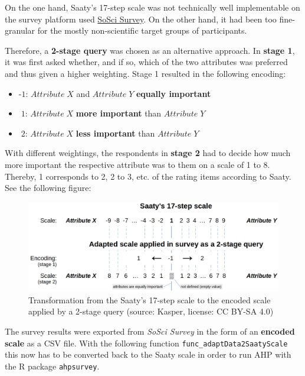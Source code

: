 \documentclass [oneside,10pt,a4paper,ngerman,BCOR10mm,headsepline,parindent,final]{scrartcl}
\providecommand{\tightlist}{%
      \setlength{\itemsep}{0pt}\setlength{\parskip}{0pt}}
\begin{document}
On the one hand, Saaty's 17-step scale was not technically well
implementable on the survey platform used
\href{https://www.soscisurvey.de/}{SoSci Survey}. On the other hand, it
had been too fine-granular for the mostly non-scientific target groups
of participants.

Therefore, a \textbf{2-stage query} was chosen as an alternative
approach. In \textbf{stage 1}, it was first asked whether, and if so,
which of the two attributes was preferred and thus given a higher
weighting. Stage 1 resulted in the following encoding:

\begin{itemize}
\tightlist
\item
  \(\text{-}1\): \(Attribute\;X\) and \(Attribute\;Y\) \textbf{equally
  important}
\item
  \(\;1\): \(Attribute\;X\) \textbf{more important} than
  \(Attribute\;Y\)
\item
  \(\;2\): \(Attribute\;X\) \textbf{less important} than
  \(Attribute\;Y\)
\end{itemize}

    With different weightings, the respondents in \textbf{stage 2} had to
decide how much more important the respective attribute was to them on a
scale of 1 to 8. Thereby, 1 corresponds to 2, 2 to 3, etc. of the rating
items according to Saaty. See the following figure:

\begin{figure}
\centering
\includegraphics{images/Saaty_scale_to_SoSciSurvey.png}
\caption{Transformation from the Saaty's 17-step scale to the encoded
scale applied by a 2-stage query (source: Kasper, license: CC BY-SA
4.0)}
\end{figure}

The survey results were exported from \emph{SoSci Survey} in the form of
an \textbf{encoded scale} as a CSV file. With the following function
\texttt{func\_adaptData2SaatyScale} this now has to be converted back to
the Saaty scale in order to run AHP with the R package
\texttt{ahpsurvey}.
\end{document}
